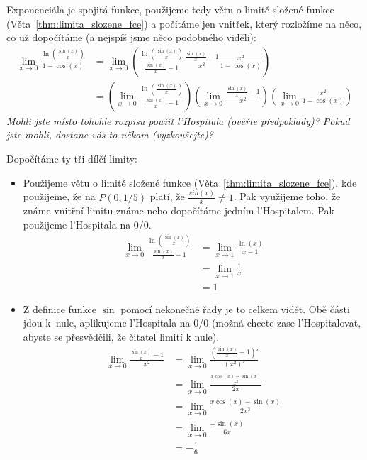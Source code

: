 \begin{enumerate}
{			Exponenciála je spojitá funkce, použijeme tedy větu o limitě složené funkce (Věta~\ref{thm:limita_slozene_fce}) a počítáme jen vnitřek, který rozložíme na něco, co už dopočítáme (a nejspíš jsme něco podobného viděli):
			\begin{align*}
				\lim_{x \rightarrow 0} \frac{\ln\left( \frac{\sin(x)}{x} \right)}{1-\cos(x)}
				&= \lim_{x \rightarrow 0}
					\left( \frac{\ln\left( \frac{\sin(x)}{x} \right)}{\frac{\sin(x)}{x} - 1} \frac{\frac{\sin(x)}{x} - 1}{x^2} \frac{x^2}{1-\cos(x)} \right) \tag{Věta o aritmetice limit} \\
				&=
					\left( \lim_{x \rightarrow 0} \frac{\ln\left( \frac{\sin(x)}{x} \right)}{\frac{\sin(x)}{x} - 1} \right)
					\left( \lim_{x \rightarrow 0} \frac{\frac{\sin(x)}{x} - 1}{x^2} \right)
					\left( \lim_{x \rightarrow 0} \frac{x^2}{1-\cos(x)} \right)
			\end{align*}
			\emph{
				Mohli jste místo tohohle rozpisu použít l'Hospitala (ověřte předpoklady)?
				Pokud jste mohli, dostane vás to někam (vyzkoušejte)?
			}

			Dopočítáme ty tři dílčí limity:
			\begin{itemize}

				\item  
					Použijeme větu o limitě složené funkce (Věta~\ref{thm:limita_slozene_fce}), kde použijeme, že na $P(0, 1/5)$ platí, že $\frac{sin(x)}{x} \neq 1$.
					Pak využijeme toho, že známe vnitřní limitu známe nebo dopočítáme jedním l'Hospitalem.
					Pak použijeme l'Hospitala na 0/0.
					\begin{align*}
						\lim_{x \rightarrow 0} \frac{\ln\left( \frac{\sin(x)}{x} \right)}{\frac{\sin(x)}{x} - 1} &= \lim_{x \rightarrow 1} \frac{\ln(x)}{x - 1} \\
						&= \lim_{x \rightarrow 1} \frac{1}{x} \\
						&= 1
					\end{align*}

				\item  Z definice funkce $\sin$ pomocí nekonečné řady je to celkem vidět.
					Obě části jdou k~nule, aplikujeme l'Hospitala na 0/0 (možná chcete zase l'Hospitalovat, abyste se přesvědčili, že čitatel limití k nule).
					\begin{align*}
						\lim_{x \rightarrow 0} \frac{\frac{\sin(x)}{x} - 1}{x^2} &= \lim_{x \rightarrow 0} \frac{\left( \frac{\sin(x)}{x} - 1 \right)'}{(x^2)'} \\
						&= \lim_{x \rightarrow 0} \frac{ \frac{x \cos(x) - \sin(x)}{x^2} }{2x} \tag{zjednodušíme, jinak budeme litovat} \\
						&= \lim_{x \rightarrow 0} \frac{ x \cos(x) - \sin(x) }{2x^3} \tag{l'H 0/0} \\
						&= \lim_{x \rightarrow 0} \frac{ -\sin(x) }{6x} \tag{l'H 0/0} \\
						&= -\frac{1}{6}
					\end{align*}


\end{itemize}}
\end{enumerate}
